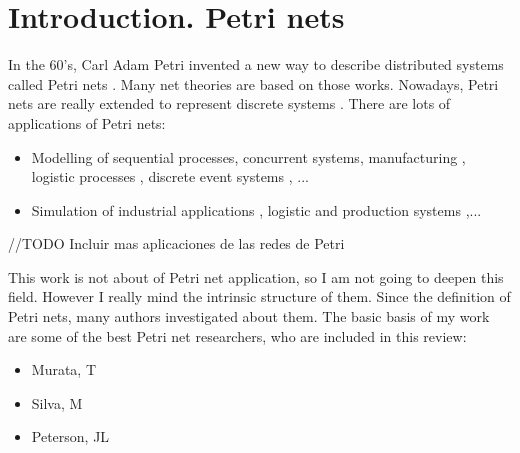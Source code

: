 \section{Introduction. Petri nets}

In the 60's, Carl Adam Petri invented a new way to describe distributed systems
called Petri nets \citep{G-Petri1962PhD,G-Petri1966,G-Petri1976}. Many net
theories
are based on those works\cite{G-Petri2007}. Nowadays,
Petri nets are really extended to represent discrete systems \cite{G-EPN-Jimenez20044897,SM-Holloway1997151,EPN-SM-Latorre2010152,EPN-SM-Latorre2010247,EPN-SM-Silva2011427}. There are lots of applications
of Petri nets:

\begin{itemize}
\item Modelling of sequential processes\cite{SM-Recalde1998267}, concurrent
systems\cite{EPN-SM-Jensen2007213,EPN-SM-Kristensen200819}, manufacturing \cite{G-Silva1989374,SM-Desrochers2010,SM-Silva19931,SM-Silva1997182,G-Silva201213}, logistic
processes \cite{SM-Guasch2002}, discrete event systems \cite{EPN-Balbo1998}, ...
\item Simulation of industrial applications \cite{SM-Jimenez2006159,SM-Latorre2013346}, logistic and production systems \cite{SM-Jimenez2004143},...
\end{itemize} 

//TODO Incluir mas aplicaciones de las redes de Petri


This work is not about of Petri net application, so I am not
going to deepen this field. 
However I really mind the intrinsic structure of them. Since the definition
of Petri nets,
many authors investigated about them. The basic basis of my work are some of the best Petri net researchers, who are included in this review:
\begin{itemize}
\item Murata, T \cite{G-Murata1977412,G-SM-Murata19772,G-Murata1989541}
\item Silva, M \cite{G-Silva1985,G-Silva1993,G-Silva201213}
\item Peterson, JL \cite{G-EPN-Peterson1981}
\end{itemize} 



